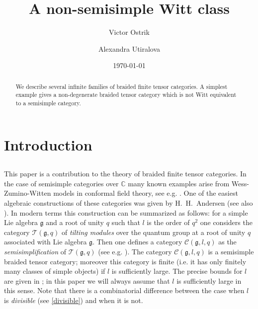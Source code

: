\documentclass{amsart}
\theoremstyle{definition}
\newcommand{\C}{\mathcal{C}}
\newcommand{\BC}{\mathbb{C}}
\newcommand{\g}{\mathfrak{g}}
\newcommand{\T}{\mathcal{T}}
\numberwithin{equation}{section}
\begin{document}
\title{A non-semisimple Witt class}


\author{Victor Ostrik}
\address{V.O.: Department of Mathematics,
University of Oregon, Eugene, OR 97403, USA}

\author{Alexandra Utiralova}
\address{V.O.: Department of Mathematics,
University of Oregon, Eugene, OR 97403, USA}


\begin{abstract} We describe several infinite families of braided finite tensor categories.
A simplest example gives a non-degenerate braided tensor category which is not Witt equivalent
to a semisimple category.
\end{abstract}

\date{\today} 
\maketitle  

\section{Introduction}
\subsection{}
This paper is a contribution to the theory of braided finite tensor categories. In the case
of semisimple categories over $\BC$ many known examples arise from Wess-Zumino-Witten
models in conformal field theory, see e.g. \cite{BK}. One of the easiest algebraic constructions of these categories was given
by H.~H.~Andersen \cite{An} (see also \cite{Saw}). In modern terms this construction can be summarized
as follows: for a simple Lie algebra $\g$ and a root of unity $q$ such that $l$ is the order of $q^2$ one considers
the category $\T(\g,q)$ of {\em tilting modules} over the quantum group at a root of unity $q$ associated 
with Lie algebra $\g$. Then one defines a category $\C(\g, l, q)$ as the {\em semisimplification}
of   $\T(\g,q)$ (see e.g. \cite{EOsemi}). The category $\C(\g, l, q)$ is a semisimple braided tensor
category; moreover this category is finite (i.e. it has only finitely many classes of simple objects) if
$l$ is sufficiently large. The precise bounds for $l$ are given in \cite[Figure 2]{Scho}; in this paper 
we will always assume that $l$ is sufficiently large in this sense. Note that there is a combinatorial 
difference between the case when $l$ is {\em divisible} (see \ref{divisible}) and when it is not. 
\end{document}
